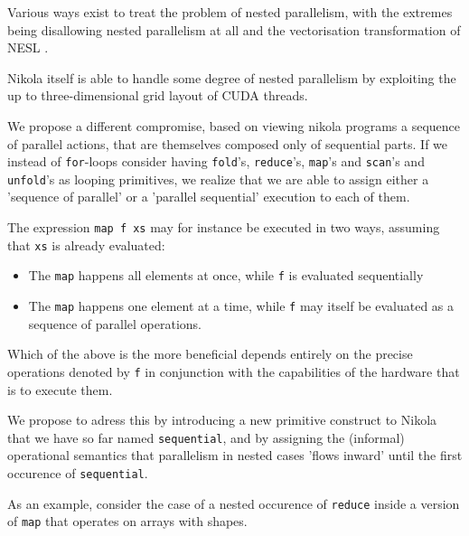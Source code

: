 Various ways exist to treat the problem of nested parallelism, with the
extremes being disallowing nested parallelism at all and the vectorisation
transformation of NESL \cite{nesl}.

Nikola itself is able to handle some degree of nested parallelism by exploiting
the up to three-dimensional grid layout of CUDA threads.


We propose a different compromise, based on viewing nikola programs a sequence
of parallel actions, that are themselves composed only of sequential parts.  If we instead of
\texttt{for}-loops consider having \texttt{fold}'s, \texttt{reduce}'s, \texttt{map}'s
and \texttt{scan}'s and \texttt{unfold}'s as looping primitives, we realize that
we are able to assign either a 'sequence of parallel' or a 'parallel sequential'
execution to each of them.


The expression \texttt{map f xs} may for instance be executed in two ways,
assuming that \texttt{xs} is already evaluated:

\begin{itemize}

\item The \texttt{map} happens all elements at once, while \texttt{f} is
evaluated sequentially

\item The \texttt{map} happens one element at a time, while \texttt{f} may itself
be evaluated as a sequence of parallel operations.

\end{itemize}

Which of the above is the more beneficial depends entirely on the precise
operations denoted by \texttt{f} in conjunction with the capabilities of the
hardware that is to execute them.

We propose to adress this by introducing a new primitive construct to Nikola
that we have so far named \texttt{sequential}, and by assigning the (informal)
operational semantics that parallelism in nested cases 'flows inward' until the
first occurence of \texttt{sequential}.

As an example, consider the case of a nested occurence of \texttt{reduce}
inside a version of \texttt{map} that operates on arrays with shapes.

